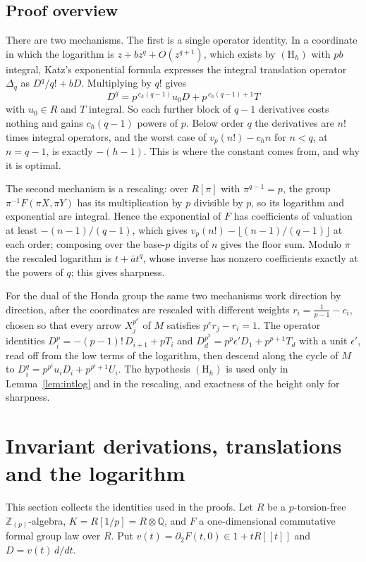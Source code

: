 \documentclass[11pt]{amsart}
\theoremstyle{definition}
\theoremstyle{remark}
\newcommand{\Z}{\mathbb Z}
\newcommand{\Q}{\mathbb Q}
\newcommand{\vp}{v_p}
\begin{document}
\subsection{Proof overview}
There are two mechanisms. The first is a single operator identity. In a coordinate in which the logarithm is $z+bz^q+O(z^{q+1})$, which exists by $(\mathrm H_h)$ with $pb$ integral, Katz's exponential formula expresses the integral translation operator $\Delta_q$ as $D^q/q!+bD$. Multiplying by $q!$ gives
\[
 D^q=p^{\,c_h(q-1)}u_0D+p^{\,c_h(q-1)+1}T
\]
with $u_0\in R$ and $T$ integral. So each further block of $q-1$ derivatives costs nothing and gains $c_h(q-1)$ powers of $p$. Below order $q$ the derivatives are $n!$ times integral operators, and the worst case of $\vp(n!)-c_hn$ for $n<q$, at $n=q-1$, is exactly $-(h-1)$. This is where the constant comes from, and why it is optimal.

The second mechanism is a rescaling: over $R[\pi]$ with $\pi^{q-1}=p$, the group $\pi^{-1}F(\pi X,\pi Y)$ has its multiplication by $p$ divisible by $p$, so its logarithm and exponential are integral. Hence the exponential of $F$ has coefficients of valuation at least $-(n-1)/(q-1)$, which gives $\vp(n!)-\lfloor (n-1)/(q-1)\rfloor$ at each order; composing over the base-$p$ digits of $n$ gives the floor sum. Modulo $\pi$ the rescaled logarithm is $t+\bar at^q$, whose inverse has nonzero coefficients exactly at the powers of $q$; this gives sharpness.

For the dual of the Honda group the same two mechanisms work direction by direction, after the coordinates are rescaled with different weights $r_i=\frac1{p-1}-c_i$, chosen so that every arrow $X_j^{p^e}$ of $M$ satisfies $p^er_j-r_i=1$. The operator identities $D_i^p=-(p-1)!\,D_{i+1}+pT_i$ and $D_d^{p^2}=p^p\epsilon'D_1+p^{p+1}T_d$ with a unit $\epsilon'$, read off from the low terms of the logarithm, then descend along the cycle of $M$ to $D_i^q=p^{p^i}u_iD_i+p^{p^i+1}U_i$. The hypothesis $(\mathrm H_h)$ is used only in Lemma~\ref{lem:intlog} and in the rescaling, and exactness of the height only for sharpness.

\section{Invariant derivations, translations and the logarithm}\label{sec:prelim}

This section collects the identities used in the proofs. Let $R$ be a $p$-torsion-free $\Z_{(p)}$-algebra, $K=R[1/p]=R\otimes\Q$, and $F$ a one-dimensional commutative formal group law over $R$. Put $v(t)=\partial_2F(t,0)\in1+tR[[t]]$ and $D=v(t)\,d/dt$.
\end{document}
